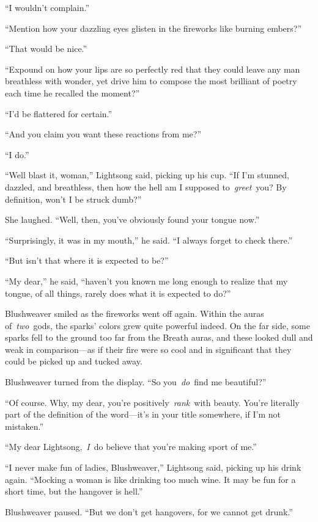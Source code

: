 “I wouldn’t complain.”

“Mention how your dazzling eyes glisten in the fireworks like burning embers?”

“That would be nice.”

“Expound on how your lips are so perfectly red that they could leave any man breathless with wonder, yet drive him to compose the most brilliant of poetry each time he recalled the moment?”

“I’d be flattered for certain.”

“And you claim you want these reactions from me?”

“I do.”

“Well blast it, woman,” Lightsong said, picking up his cup. “If I’m stunned, dazzled, and breathless, then how the hell am I supposed to~\textit{greet}~you? By definition, won’t I be struck dumb?”

She laughed. “Well, then, you’ve obviously found your tongue now.”

“Surprisingly, it was in my mouth,” he said. “I always forget to check there.”

“But isn’t that where it is expected to be?”

“My dear,” he said, “haven’t you known me long enough to realize that my tongue, of all things, rarely does what it is expected to do?”

Blushweaver smiled as the fireworks went off again. Within the auras of~\textit{two}~gods, the sparks’ colors grew quite powerful indeed. On the far side, some sparks fell to the ground too far from the Breath auras, and these looked dull and weak in comparison—as if their fire were so cool and in significant that they could be picked up and tucked away.

Blushweaver turned from the display. “So you~\textit{do}~find me beautiful?”

“Of course. Why, my dear, you’re positively~\textit{rank}~with beauty. You’re literally part of the definition of the word—it’s in your title somewhere, if I’m not mistaken.”

“My dear Lightsong,~\textit{I}~do believe that you’re making sport of me.”

“I never make fun of ladies, Blushweaver,” Lightsong said, picking up his drink again. “Mocking a woman is like drinking too much wine. It may be fun for a short time, but the hangover is hell.”

Blushweaver paused. “But we don’t get hangovers, for we cannot get drunk.”

